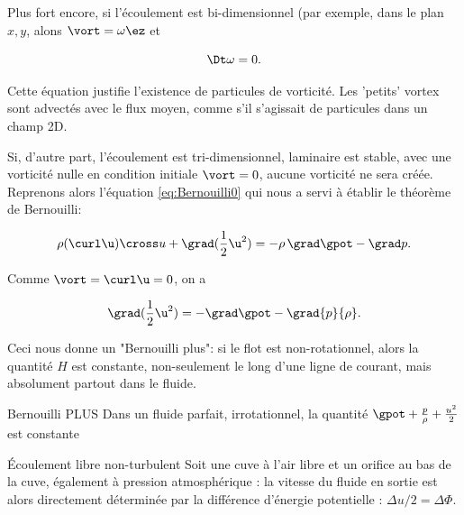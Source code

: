 Plus fort encore, si l'écoulement est bi-dimensionnel (par exemple, dans le plan $x,y$, alons $\vort = \omega \ez$ et

\begin{equation}
 \Dt\omega = 0. 
\label{eq:vort2d}
\end{equation}


Cette équation justifie l'existence de particules  de vorticité. Les 'petits' vortex sont advectés avec le flux moyen, comme s'il s'agissait de particules dans un champ 2D. 

Si, d'autre part, l'écoulement est tri-dimensionnel, laminaire est stable, avec une vorticité nulle en condition initiale $\vort=0$, aucune vorticité ne sera créée. Reprenons alors l'équation \eqref{eq:Bernouilli0} qui nous a servi à établir le théorème de Bernouilli: 

\begin{displaymath}
  \rho (\curl \u)\cross u + \grad(\frac{1}{2}\u^2) = - \rho \, \grad \gpot - \grad p.
\label{eq:Bernouilli0}
\end{displaymath}

Comme $\vort = \curl \u =0$, on a 

\begin{displaymath}
  \grad(\frac{1}{2}\u^2) = - \grad \gpot - \grad {p}{\rho}.
\end{displaymath}

Ceci nous donne un "Bernouilli plus": si le flot est non-rotationnel, alors la quantité $H$ est constante, non-seulement le long d'une ligne de courant, mais absolument partout dans le fluide. 

\begin{key}{Bernouilli PLUS}
  Dans un fluide parfait, irrotationnel, la quantité $\gpot + \frac{p}{\rho} + \frac{u^2}{2}$ est constante
\end{key}



\begin{application}{Écoulement libre non-turbulent}
Soit une cuve à l'air libre et un orifice au bas de la cuve, également à pression atmosphérique : la vitesse du fluide en sortie est alors directement déterminée par la différence d'énergie potentielle : $\Delta u/2 = \Delta \Phi$. 

\centering
    
\end{application}

